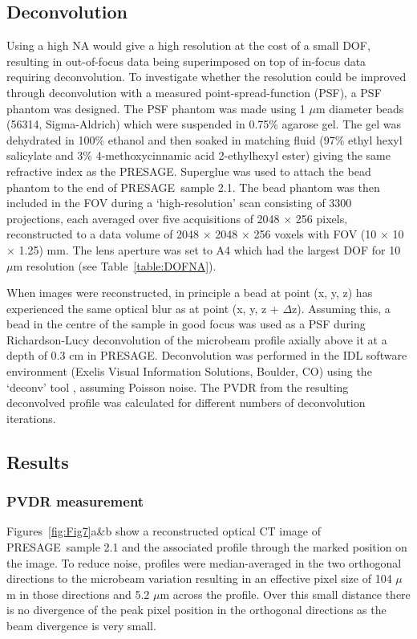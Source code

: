 	\subsection{Deconvolution}
	Using a high NA would give a high resolution at the cost of a small DOF, resulting in out-of-focus data being superimposed on top of in-focus data requiring deconvolution. To investigate whether the resolution could be improved through deconvolution with a measured point-spread-function (PSF), a PSF phantom was designed. The PSF phantom was made using 1 $\mu$m diameter beads (56314, Sigma-Aldrich) which were suspended in 0.75\% agarose gel. The gel was dehydrated in 100\% ethanol and then soaked in matching fluid (97\% ethyl hexyl salicylate and 3\% 4-methoxycinnamic acid 2-ethylhexyl ester) giving the same refractive index as the PRESAGE\textregistered. Superglue was used to attach the bead phantom to the end of PRESAGE\textregistered \ sample 2.1. The bead phantom was then included in the FOV during a `high-resolution' scan consisting of 3300 projections, each averaged over five acquisitions of 2048 $\times$ 256 pixels, reconstructed to a data volume of 2048 $\times$ 2048 $\times$ 256 voxels with FOV (10 $\times$ 10 $\times$ 1.25) mm. The lens aperture was set to A4  which had the largest DOF for 10 $\mu$m resolution (see Table~\ref{table:DOFNA}). 
	
	When images were reconstructed, in principle a bead at point (x, y, z) has experienced the same optical blur as at point (x, y, z + $\Delta $z). Assuming this, a bead in the centre of the sample in good focus was used as a PSF during Richardson-Lucy deconvolution of the microbeam profile axially above it at a depth of 0.3 cm in PRESAGE\textregistered. Deconvolution was performed in the IDL software environment (Exelis Visual Information Solutions, Boulder, CO) using the `deconv' tool \cite{varosi1993idl}, assuming Poisson noise. The PVDR from the resulting deconvolved profile was calculated for different numbers of deconvolution iterations.
	
	\subsection{Results}

	
	\subsubsection{PVDR measurement} 
	Figures~\ref{fig:Fig7}a\&b show a reconstructed optical CT image of PRESAGE\textregistered \ sample 2.1 and the associated profile through the marked position on the image. To reduce noise, profiles were median-averaged in the two orthogonal directions to the microbeam variation resulting in an effective pixel size of 104 $\mu$m in those directions and 5.2 $\mu$m across the profile. Over this small distance there is no divergence of the peak pixel position in the orthogonal directions as the beam divergence is very small. 
	
